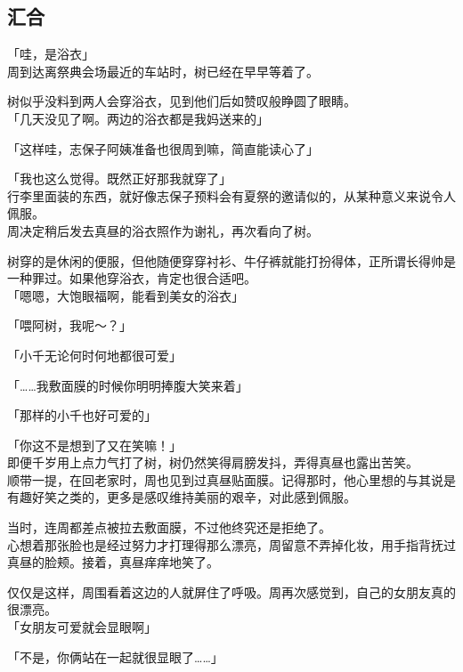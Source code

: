 \subsection{汇合}

「哇，是浴衣」\\

周到达离祭典会场最近的车站时，树已经在早早等着了。

树似乎没料到两人会穿浴衣，见到他们后如赞叹般睁圆了眼睛。\\

「几天没见了啊。两边的浴衣都是我妈送来的」

「这样哇，志保子阿姨准备也很周到嘛，简直能读心了」

「我也这么觉得。既然正好那我就穿了」\\

行李里面装的东西，就好像志保子预料会有夏祭的邀请似的，从某种意义来说令人佩服。\\

周决定稍后发去真昼的浴衣照作为谢礼，再次看向了树。

树穿的是休闲的便服，但他随便穿穿衬衫、牛仔裤就能打扮得体，正所谓长得帅是一种罪过。如果他穿浴衣，肯定也很合适吧。\\

「嗯嗯，大饱眼福啊，能看到美女的浴衣」

「喂阿树，我呢～？」

「小千无论何时何地都很可爱」

「……我敷面膜的时候你明明捧腹大笑来着」

「那样的小千也好可爱的」

「你这不是想到了又在笑嘛！」\\

即便千岁用上点力气打了树，树仍然笑得肩膀发抖，弄得真昼也露出苦笑。\\

顺带一提，在回老家时，周也见到过真昼贴面膜。记得那时，他心里想的与其说是有趣好笑之类的，更多是感叹维持美丽的艰辛，对此感到佩服。

当时，连周都差点被拉去敷面膜，不过他终究还是拒绝了。\\

心想着那张脸也是经过努力才打理得那么漂亮，周留意不弄掉化妆，用手指背抚过真昼的脸颊。接着，真昼痒痒地笑了。

仅仅是这样，周围看着这边的人就屏住了呼吸。周再次感觉到，自己的女朋友真的很漂亮。\\

「女朋友可爱就会显眼啊」

「不是，你俩站在一起就很显眼了……」

